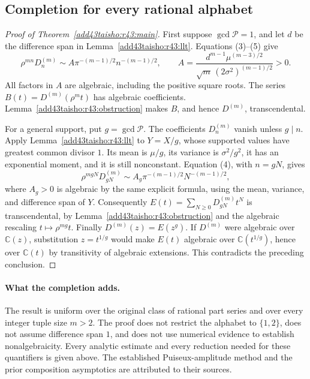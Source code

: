 \documentclass[11pt,a4paper]{article}
\numberwithin{equation}{section}
\theoremstyle{definition}
\theoremstyle{remark}
\begin{document}
\subsection{Completion for every rational alphabet}

\begin{proof}[Proof of Theorem~\ref{add43taisho:r43:main}]
First suppose $\gcd\mathcal P=1$, and let $d$ be the difference span
in Lemma~\ref{add43taisho:r43:llt}.  Equations (3)--(5) give
\[
 \rho^{mn}D_n^{(m)}
 \sim A\pi^{-(m-1)/2}n^{-(m-1)/2},\qquad
 A=\frac{d^{m-1}\mu^{(m-3)/2}}
         {\sqrt m\,(2\sigma^2)^{(m-1)/2}}>0.        \tag{15}
\]
All factors in $A$ are algebraic, including the positive square roots.
The series $B(t)=D^{(m)}(\rho^m t)$ has algebraic coefficients.
Lemma~\ref{add43taisho:r43:obstruction} makes $B$, and hence $D^{(m)}$,
transcendental.

For a general support, put $g=\gcd\mathcal P$.  The coefficients
$D_n^{(m)}$ vanish unless $g\mid n$.  Apply Lemma~\ref{add43taisho:r43:llt} to
$Y=X/g$, whose supported values have greatest common divisor $1$.
Its mean is $\mu/g$, its variance is $\sigma^2/g^2$, it has an
exponential moment, and it is still nonconstant.  Equation (4), with
$n=gN$, gives
\[
 \rho^{mgN}D_{gN}^{(m)}
 \sim A_g\pi^{-(m-1)/2}N^{-(m-1)/2},               \tag{16}
\]
where $A_g>0$ is algebraic by the same explicit formula, using the
mean, variance, and difference span of $Y$.
Consequently $E(t)=\sum_{N\ge0}D_{gN}^{(m)}t^N$ is transcendental,
by Lemma~\ref{add43taisho:r43:obstruction} and the algebraic rescaling
$t\mapsto\rho^{mg}t$.
Finally $D^{(m)}(z)=E(z^g)$.  If $D^{(m)}$ were algebraic over
$\mathbb C(z)$, substitution $z=t^{1/g}$ would make $E(t)$ algebraic
over $\mathbb C(t^{1/g})$, hence over $\mathbb C(t)$ by transitivity
of algebraic extensions.  This contradicts the preceding conclusion.
\end{proof}

\paragraph{What the completion adds.}
The result is uniform over the original class of rational part series
and over every integer tuple size $m>2$.  The proof does not restrict
the alphabet to $\{1,2\}$, does not assume difference span $1$, and
does not use numerical evidence to establish nonalgebraicity.  Every
analytic estimate and every reduction needed for these quantifiers is
given above.  The established Puiseux-amplitude method and the prior
composition asymptotics are attributed to their sources.
\end{document}
